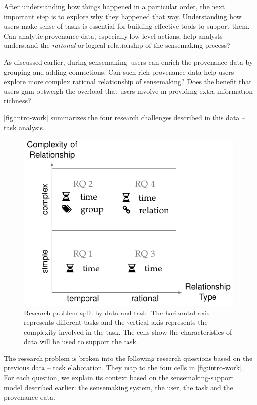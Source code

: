 \begin{enumerate}
	After understanding how things happened in a particular order, the next important step is to explore why they happened that way. Understanding how users make sense of tasks is essential for building effective tools to support them. Can analytic provenance data, especially low-level actions, help analysts understand the \emph{rational} or logical relationship of the sensemaking process?
	
	As discussed earlier, during sensemaking, users can enrich the provenance data by grouping and adding connections. Can such rich provenance data help users explore more complex rational relationship of sensemaking? Does the benefit that users gain outweigh the overload that users involve in providing extra information richness?
\end{enumerate}

\autoref{fig:intro-work} summarizes the four research challenges described in this data -- task analysis.

\begin{figure}[!htb]
	\centering
	\includegraphics{work}
	\caption{Research problem split by data and task. The horizontal axis represents different tasks and the vertical axis represents the complexity involved in the  task. The cells show the characteristics of data will be used to support the task.}
	\label{fig:intro-work}
\end{figure}

The research problem is broken into the following research questions based on the previous data -- task elaboration. They map to the four cells in \autoref{fig:intro-work}. For each question, we explain its context based on the sensemaking-support model described earlier: the sensemaking system, the user, the task and the provenance data. 

